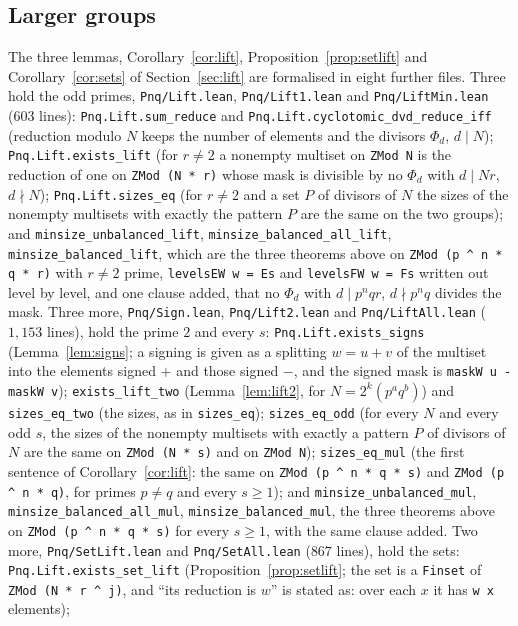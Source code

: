 \documentclass[11pt,a4paper]{amsart}
\theoremstyle{definition}
\theoremstyle{remark}
\newcommand{\lean}[1]{\texttt{#1}}
\begin{document}
\subsection*{Larger groups} The three lemmas, Corollary~\ref{cor:lift}, Proposition~\ref{prop:setlift} and Corollary~\ref{cor:sets} of Section~\ref{sec:lift} are formalised in eight further files. Three hold the odd primes,
\lean{Pnq/Lift.lean}, \lean{Pnq/Lift1.lean} and \lean{Pnq/LiftMin.lean} (603 lines):
\lean{Pnq.Lift.sum\_reduce} and \lean{Pnq.Lift.cyclotomic\_dvd\_reduce\_iff} (reduction modulo $N$ keeps the number of elements and the divisors $\Phi_d$, $d\mid N$);
\lean{Pnq.Lift.exists\_lift} (for $r\neq2$ a nonempty multiset on \lean{ZMod N} is the reduction of one on
\lean{ZMod (N * r)} whose mask is divisible by no $\Phi_d$ with $d\mid Nr$, $d\nmid N$);
\lean{Pnq.Lift.sizes\_eq} (for $r\neq2$ and a set $P$ of divisors of $N$ the sizes of the nonempty multisets with exactly the
pattern $P$ are the same on the two groups); and \lean{minsize\_unbalanced\_lift},
\lean{minsize\_balanced\_all\_lift}, \lean{minsize\_balanced\_lift}, which are the three theorems above on
\lean{ZMod (p \^{} n * q * r)} with $r\ne2$ prime, \lean{levelsEW w = Es} and \lean{levelsFW w = Fs} written out level by level, and one clause added, that no $\Phi_d$ with $d\mid p^nqr$, $d\nmid p^nq$ divides the mask.
Three more, \lean{Pnq/Sign.lean}, \lean{Pnq/Lift2.lean} and \lean{Pnq/LiftAll.lean} ($1{,}153$ lines), hold the prime $2$ and every $s$:
\lean{Pnq.Lift.exists\_signs} (Lemma~\ref{lem:signs}; a signing is given as a splitting $w=u+v$ of the multiset into the
elements signed $+$ and those signed $-$, and the signed mask is \lean{maskW u - maskW v});
\lean{exists\_lift\_two} (Lemma~\ref{lem:lift2}, for $N=2^k(p^aq^b)$) and \lean{sizes\_eq\_two} (the sizes, as in \lean{sizes\_eq});
\lean{sizes\_eq\_odd} (for every $N$ and every odd $s$, the sizes of the nonempty multisets with exactly a pattern $P$ of divisors of $N$ are the same on
\lean{ZMod (N * s)} and on \lean{ZMod N});
\lean{sizes\_eq\_mul} (the first sentence of Corollary~\ref{cor:lift}: the same on \lean{ZMod (p \^{} n * q * s)} and
\lean{ZMod (p \^{} n * q)}, for primes $p\ne q$ and every $s\ge1$); and \lean{minsize\_unbalanced\_mul},
\lean{minsize\_balanced\_all\_mul}, \lean{minsize\_balanced\_mul}, the three theorems above on
\lean{ZMod (p \^{} n * q * s)} for every $s\ge1$, with the same clause added.
Two more, \lean{Pnq/SetLift.lean} and \lean{Pnq/SetAll.lean} ($867$ lines), hold the sets:
\lean{Pnq.Lift.exists\_set\_lift} (Proposition~\ref{prop:setlift}; the set is a \lean{Finset} of \lean{ZMod (N * r \^{} j)}, and ``its reduction is $w$'' is stated as: over each $x$ it has \lean{w x} elements);
\end{document}
